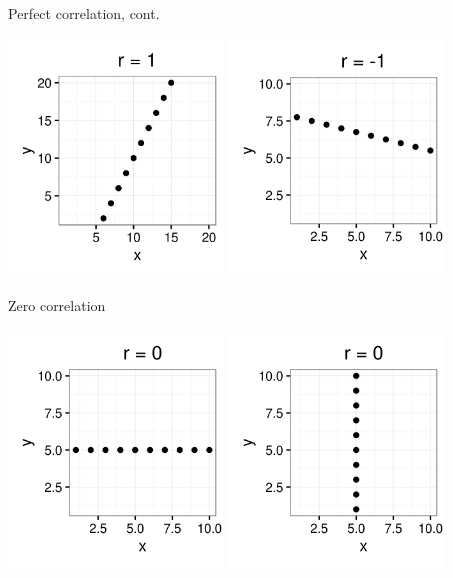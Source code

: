 \documentclass[xcolor=table]{beamer}
\begin{document}
\begin{frame}{Perfect correlation, cont.}

{\centering
\includegraphics[width=2.25in]{../images/ch10_cor_pos2}
\includegraphics[width=2.25in]{../images/ch10_cor_neg2}
\par}
\end{frame}

\begin{frame}{Zero correlation}

{\centering
\includegraphics[width=2.25in]{../images/ch10_cor_zero}
\includegraphics[width=2.25in]{../images/ch10_cor_zerox}
\par}
\end{frame}
\end{document}
